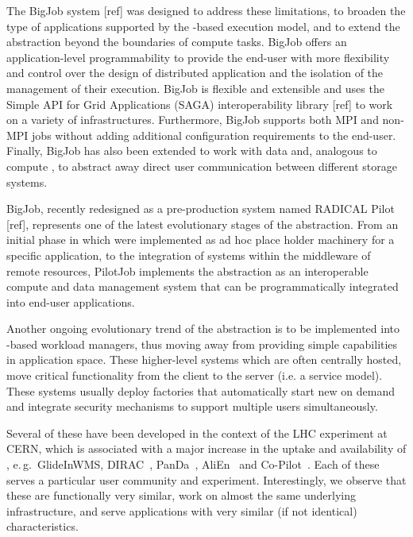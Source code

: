 \documentclass{sig-alternate}
\begin{document}
The BigJob \pilot system [ref] was designed to address these limitations, to
broaden the type of applications supported by the \pilot-based execution model,
and to extend the \pilot abstraction beyond the boundaries of compute tasks.
BigJob offers an application-level programmability to provide the end-user with
more flexibility and control over the design of distributed application and the
isolation of the management of their execution. BigJob is flexible and
extensible and uses the Simple API for Grid Applications (SAGA)
interoperability library [ref] to work on a variety of infrastructures.
Furthermore, BigJob supports both MPI and non-MPI jobs without adding
additional configuration requirements to the end-user. Finally, BigJob has also
been extended to work with data and, analogous to compute \pilots, to abstract
away direct user communication between different storage systems.

BigJob, recently redesigned as a pre-production system named RADICAL Pilot
[ref], represents one of the latest evolutionary stages of the \pilot
abstraction. From an initial phase in which \pilot were implemented as ad hoc
place holder machinery for a specific application, to the integration of \pilot
systems within the middleware of remote resources, PilotJob implements the
\pilot abstraction as an interoperable compute and data management system that
can be programmatically integrated into end-user applications.

Another ongoing evolutionary trend of the \pilot abstraction is to be
implemented into \pilot-based workload managers, thus moving away from
providing simple \pilot capabilities in application space. These higher-level
systems which are often centrally hosted, move critical functionality from the
client to the server (i.e. a service model). These systems usually deploy
\pilot factories that automatically start new \pilots on demand and integrate
security mechanisms to support multiple users simultaneously.

Several of these have been developed in the context of the LHC experiment at
CERN, which is associated with a major increase in the uptake and availability
of \pilots, e.\,g.\ GlideInWMS, DIRAC~\cite{1742-6596-219-6-062049},
PanDa~\cite{1742-6596-331-7-072069}, AliEn~\cite{1742-6596-119-6-062012} and
Co-Pilot~\cite{copilot-tr}. Each of these \pilots serves a particular user
community and experiment. Interestingly, we observe that these \pilots are
functionally very similar, work on almost the same underlying infrastructure,
and serve applications with very similar (if not identical) characteristics.
\end{document}
